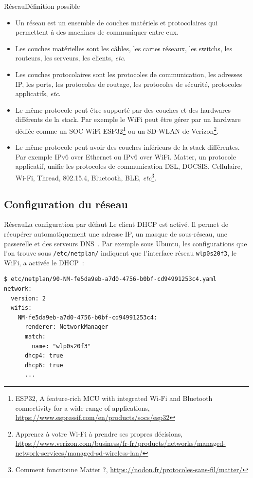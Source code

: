 \documentclass{beamer}
\begin{document}
    \begin{frame}{Réseau}{Définition possible}
        \begin{scriptsize}
            \begin{itemize}
                \item Un réseau est un ensemble de couches matériels et protocolaires qui permettent à des machines de communiquer entre eux.
                \item Les couches matérielles sont les câbles, les cartes réseaux, les switchs, les routeurs, les serveurs, les clients, \textit{etc}.
                \item Les couches protocolaires sont les protocoles de communication, les adresses IP, les ports, les protocoles de routage, les protocoles de sécurité, protocoles applicatifs, \textit{etc}.
                \item Le même protocole peut être supporté par des couches et des hardwares différents de la stack.
                Par exemple le WiFi peut être gérer par un hardware dédiée comme un SOC WiFi ESP32\footnote{ESP32, A feature-rich MCU with integrated Wi-Fi and Bluetooth connectivity for a wide-range of applications, \url{https://www.espressif.com/en/products/socs/esp32}} ou un SD-WLAN de Verizon\footnote{Apprenez à votre Wi-Fi à prendre ses propres décisions, \url{https://www.verizon.com/business/fr-fr/products/networks/managed-network-services/managed-sd-wireless-lan/}}.
                \item Le même protocole peut avoir des couches inférieurs de la stack différentes.
                Par exemple IPv6 over Ethernet ou IPv6 over WiFi.
                Matter, un protocole applicatif, unifie les protocoles de communication DSL, DOCSIS, Cellulaire, Wi-Fi, Thread, 802.15.4, Bluetooth, BLE, \textit{etc}\footnote{Comment fonctionne Matter ?, \url{https://nodon.fr/protocoles-sans-fil/matter/}}.
            \end{itemize}
        \end{scriptsize}
    \end{frame}

    \subsection{Configuration du réseau}\label{subsec:network-configuration}

    \begin{frame}[fragile]{Réseau}{La configuration par défaut}
        Le client DHCP est activé.
        Il permet de récupérer automatiquement une adresse IP, un masque de sous-réseau, une passerelle et des serveurs DNS~.
        Par exemple sous Ubuntu, les configurations que l'on trouve sous \lstinline{/etc/netplan/} indiquent que l'interface réseau \lstinline{wlp0s20f3}, le WiFi, a activée le DHCP~:
        \begin{lstlisting}
$ etc/netplan/90-NM-fe5da9eb-a7d0-4756-b0bf-cd94991253c4.yaml
network:
  version: 2
  wifis:
    NM-fe5da9eb-a7d0-4756-b0bf-cd94991253c4:
      renderer: NetworkManager
      match:
        name: "wlp0s20f3"
      dhcp4: true
      dhcp6: true
      ...
        \end{lstlisting}
    \end{frame}
\end{document}
